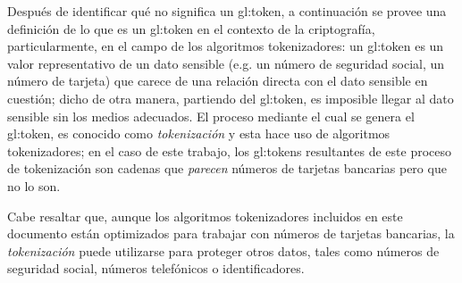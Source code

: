 Después de identificar qué no significa un \gls{gl:token}, a continuación se
provee una definición de lo que es un \gls{gl:token} en el contexto de la
criptografía, particularmente, en el campo de los algoritmos tokenizadores: un
\gls{gl:token} es un valor representativo de un dato sensible (e.g. un
número de seguridad social, un número de tarjeta) que carece de una relación
directa con el dato sensible en cuestión; dicho de otra manera, partiendo del
\gls{gl:token}, es imposible llegar al dato sensible sin los medios adecuados.
El proceso mediante el cual se genera el \gls{gl:token}, es conocido como
\textit{tokenización} y esta hace uso de algoritmos tokenizadores; en el caso
de este trabajo, los \glspl{gl:token} resultantes de este proceso de
tokenización son cadenas que \textit{parecen} números de tarjetas bancarias
pero que no lo son.

Cabe resaltar que, aunque los algoritmos tokenizadores incluidos en este
documento están optimizados para trabajar con números de tarjetas bancarias,
la \textit{tokenización} puede utilizarse para proteger otros datos, tales
como números de seguridad social, números telefónicos o identificadores.
